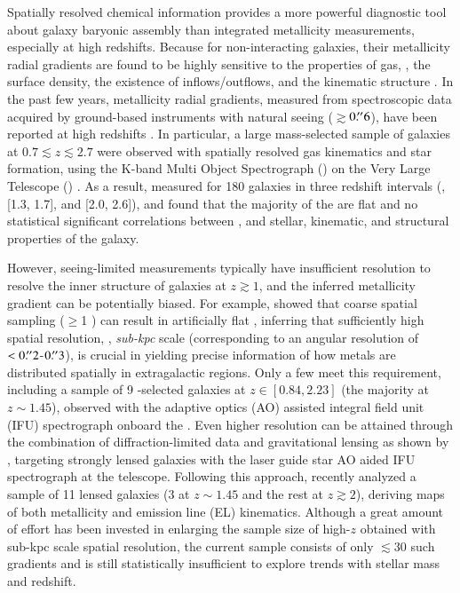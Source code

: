 Spatially resolved chemical information provides a more powerful diagnostic tool about galaxy baryonic assembly than
integrated metallicity measurements, especially at high redshifts. Because for non-interacting galaxies, their metallicity radial 
gradients are found to be highly sensitive to the properties of gas, \ie, the surface density, the existence of inflows/outflows, and the kinematic
structure \citep{Cresci:2010hr,2013ApJ...765...48J,2014A&A...563A..49S,Metallicityevolutio:2014kg}.
In the past few years, metallicity radial gradients, measured from spectroscopic data
acquired by ground-based instruments with natural seeing ($\gtrsim$$0\mbox{$.\!^{\prime\prime}$}6$), have been
reported at high redshifts
\citep{Queyrel:2012hw,Metallicityevolutio:2014kg,2014MNRAS.443.2695S}. In particular, a large
mass-selected sample of galaxies at $0.7\lesssim z\lesssim2.7$ were observed with spatially
resolved gas kinematics and star formation, using the K-band Multi Object Spectrograph
(\kmos) on the Very Large Telescope (\vlt) \citep[\ie, the \kd
survey,][]{2015ApJ...799..209W}.  As a result, \citet{2016ApJ...827...74W} measured \mgs for 180 \sf
galaxies in three redshift intervals (\ie [0.8, 1.0], [1.3, 1.7], and [2.0, 2.6]), and found
that the majority of the \mgs are flat and no statistical significant correlations between
\mgs, and stellar, kinematic, and structural properties of the galaxy.

However, seeing-limited measurements typically have insufficient resolution to resolve the inner structure of galaxies at
$z\gtrsim1$, and the inferred metallicity gradient can be potentially biased. For example, \citet{2013ApJ...767..106Y} showed that
coarse spatial sampling ($\geq$1 \kpc) can result in artificially flat \mgs, inferring that sufficiently high spatial resolution,
\ie, \emph{sub-kpc} scale (corresponding to an angular resolution of $<0\mbox{$.\!^{\prime\prime}$}2$-$0\mbox{$.\!^{\prime\prime}$}3$), is crucial in yielding precise
information of how metals are distributed spatially in extragalactic \HII regions.  Only a few \mgms meet this requirement,
including a sample of 9 \Ha-selected galaxies at $z\in[0.84,2.23]$ (the majority at $z\sim1.45$), observed with the adaptive
optics (AO) assisted integral field unit (IFU) spectrograph \sinf onboard the \vlt \citep{2012MNRAS.426..935S}. Even higher
resolution can be attained through the combination of diffraction-limited data and gravitational lensing as shown by
\citet{2010ApJ...725L.176J,2013ApJ...765...48J,Yuan:2011hj}, targeting strongly lensed galaxies with the laser guide star AO aided
IFU spectrograph \osiris at the \keck telescope. Following this approach, \citet{2015arXiv150901279L} recently analyzed a sample
of 11 lensed galaxies (3 at $z\sim1.45$ and the rest at $z\gtrsim2$), deriving maps of both metallicity and emission line (EL)
kinematics.  Although a great amount of effort has been invested in enlarging the sample size of high-$z$ \mgs obtained with
sub-kpc scale spatial resolution, the current sample consists of only $\lesssim30$ such gradients and is still statistically
insufficient to explore trends with stellar mass and redshift.

